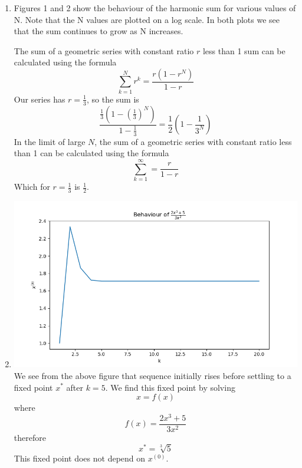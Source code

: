 \documentclass[letterpaper,12pt]{article} %
\begin{document}
\begin{enumerate}

  \item {
    Figures 1 and 2 show the behaviour of the harmonic sum for various values of N. Note that the N values are plotted on a log scale. In both plots we see that the sum continues to grow as N increases.

    The sum of a geometric series with constant ratio \(r\) less than 1 sum can be calculated using the formula\cite{geoseries}
    \[ \sum_{k=1}^{N} r^k = \frac{r(1-r^N)}{1-r} \]
    Our series has \(r = \frac{1}{3}\), so the sum is
    \[ \frac{\frac{1}{3}(1-(\frac{1}{3})^N)}{1-\frac{1}{3}} = \frac{1}{2}(1-\frac{1}{3^N}) \]
    In the limit of large \(N\), the sum of a geometric series with constant ratio less than 1 can be calculated using the formula\cite{geoseries}
    \[ \sum_{k=1}^{\infty} = \frac{r}{1-r} \]
    Which for \(r = \frac{1}{3} \) is \(\frac{1}{2}\).
  }

  \item {
    \includegraphics[width=\textwidth]{q2seq1}
    We see from the above figure that sequence initially rises before settling to a fixed point \(x^*\) after \(k=5\). We find this fixed point by solving
    \[ x = f(x) \]
    where
    \[ f(x) = \frac{2x^3 + 5}{3x^2} \]
    therefore
    \[ x^* = \sqrt[3]{5} \]
    This fixed point does not depend on \(x^{(0)}\).
    
}
\end{enumerate}
\end{document}
